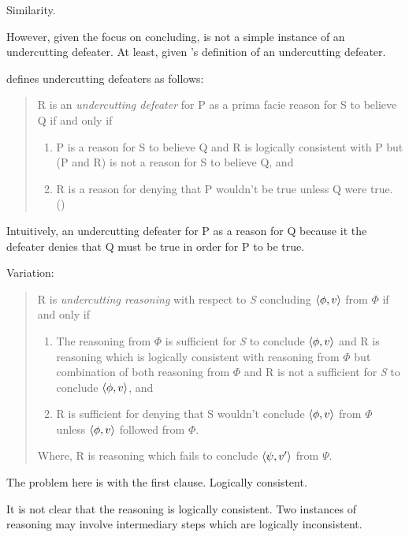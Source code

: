 \begin{note}
  Similarity.

  However, given the focus on concluding, \curb{} is not a simple instance of an undercutting defeater.
  At least, given \citeauthor{Pollock:1987un}'s definition of an undercutting defeater.

  \citeauthor{Pollock:1987un} defines undercutting defeaters as follows:
  \begin{quote}
    R is an \emph{undercutting defeater} for P as a prima facie reason for S to believe Q if and only if
    \begin{enumerate}[label=(UD\arabic*), ref=(UD\arabic*)]
    \item
      P is a reason for S to believe Q and R is logically consistent with P but (P and R) is not a reason for S to believe Q, and
    \item
      R is a reason for denying that P wouldn't be true unless Q were true.%
      \mbox{}\hfill\mbox{(\citeyear[485]{Pollock:1987un})}
    \end{enumerate}
  \end{quote}
  Intuitively, an undercutting defeater for P as a reason for Q because it the defeater denies that Q must be true in order for P to be true.

  Variation:
  \begin{quote}
    R is \emph{undercutting reasoning} with respect to \emph{S} concluding \(\langle \phi, v \rangle\) from \(\Phi\) if and only if
    \begin{enumerate}[label=(UR\arabic*), ref=(UR\arabic*)]
    \item
      The reasoning from \(\Phi\) is sufficient for \emph{S} to conclude \(\langle \phi, v \rangle\) and R is reasoning which is logically consistent with reasoning from \(\Phi\) but combination of both reasoning from \(\Phi\) and R is not a sufficient for \emph{S} to conclude \(\langle \phi, v \rangle\), and
    \item
      R is sufficient for denying that S wouldn't conclude \(\langle \phi, v \rangle\) from \(\Phi\) unless \(\langle \phi, v \rangle\) followed from \(\Phi\).%
    \end{enumerate}
    Where, R is reasoning which fails to conclude \(\langle \psi, v' \rangle\) from \(\Psi\).
  \end{quote}

  The problem here is with the first clause.
  Logically consistent.

  It is not clear that the reasoning is logically consistent.
  Two instances of reasoning may involve intermediary steps which are logically inconsistent.


\end{note}
